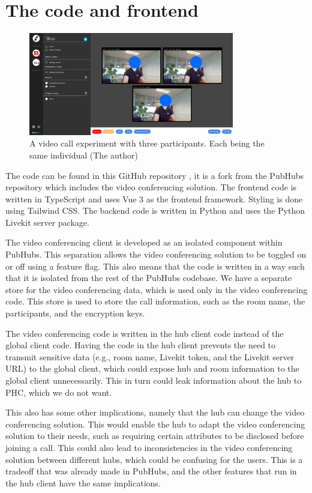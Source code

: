 \documentclass{report}
\begin{document}
\section{The code and frontend}
\begin{figure}[!hbt]
\centering
\includegraphics[width=0.8\textwidth]{img/frontend.png}
\caption{A video call experiment with three participants. Each being the same individual (The author)}
\label{fig:front-end-setup}
\end{figure}
The code can be found in this GitHub repository \cite{horst_gulianrdgdmaster-scriptie-pubhubs_2024}, it is a fork from the PubHubs
repository which includes the video conferencing solution. The frontend code is written in TypeScript and uses Vue 3
as the frontend framework. Styling is done using Tailwind CSS. The backend code is written in Python and uses the
Python Livekit server package.

The video conferencing client is developed as an isolated component within PubHubs. This separation allows the
video conferencing solution to be toggled on or off using a feature flag.
This also means that the code is written in a way such that it is isolated from the rest of the PubHubs codebase.
We have a separate store for the video conferencing data, which is used only in the video conferencing code.
This store is used to store the call information, such as the room name, the participants, and the encryption keys.

The video conferencing code is written in the hub client code instead of the global client code. Having the code in
the hub client prevents the need to transmit sensitive data (e.g., room name, Livekit token, and the Livekit
server URL) to the global client, which could expose hub and room information to the global client unnecessarily.
This in turn could leak information about the hub to PHC, which we do not want.

This also has some other implications, namely that the hub can change the video conferencing solution.
This would enable the hub to adapt the video conferencing solution to their needs, such as requiring certain
attributes to be disclosed before joining a call. This could also lead to inconsistencies in the video conferencing
solution between different hubs, which could be confusing for the users. This is a tradeoff that was already made in
PubHubs, and the other features that run in the hub client have the same implications.
\end{document}

